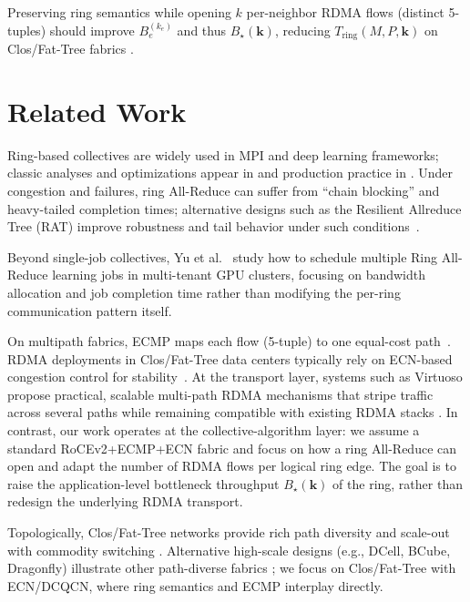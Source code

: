 \documentclass[12pt]{article}
\begin{document}
Preserving ring semantics while opening $k$ per-neighbor RDMA flows (distinct 5-tuples) should improve $B_e^{(k_e)}$ and thus $B_\star(\mathbf{k})$, reducing $T_{\text{ring}}(M,P,\mathbf{k})$ on Clos/Fat-Tree fabrics \cite{zhu2015dcqcn}.





\section{Related Work}
Ring-based collectives are widely used in MPI and deep learning frameworks; classic analyses and optimizations appear in \cite{thakur2005collectives} and production practice in \cite{sergeev2018horovod,nv-nccl-env}. Under congestion and failures, ring All-Reduce can suffer from “chain blocking” and heavy-tailed completion times; alternative designs such as the Resilient Allreduce Tree (RAT) improve robustness and tail behavior under such conditions~\cite{wan2020rat}.

Beyond single-job collectives, Yu et al.~\cite{yu2022scheduling} study how to schedule multiple Ring All-Reduce learning jobs in multi-tenant GPU clusters, focusing on bandwidth allocation and job completion time rather than modifying the per-ring communication pattern itself.

On multipath fabrics, ECMP maps each flow (5-tuple) to one equal-cost path~\cite{hopps2000rfc2992}. RDMA deployments in Clos/Fat-Tree data centers typically rely on ECN-based congestion control for stability~\cite{zhu2015dcqcn}. At the transport layer, systems such as Virtuoso propose practical, scalable multi-path RDMA mechanisms that stripe traffic across several paths while remaining compatible with existing RDMA stacks \cite{luo2020virtuoso}. In contrast, our work operates at the collective-algorithm layer: we assume a standard RoCEv2+ECMP+ECN fabric and focus on how a ring All-Reduce can open and adapt the number of RDMA flows per logical ring edge. The goal is to raise the application-level bottleneck throughput $B_\star(\mathbf{k})$ of the ring, rather than redesign the underlying RDMA transport.


Topologically, Clos/Fat-Tree networks provide rich path diversity and scale-out with commodity switching \cite{leiserson1985fattree,alfares2008scalable}. Alternative high-scale designs (e.g., DCell, BCube, Dragonfly) illustrate other path-diverse fabrics \cite{guo2008dcell,guo2009bcube,kim2008dragonfly}; we focus on Clos/Fat-Tree with ECN/DCQCN, where ring semantics and ECMP interplay directly.
\end{document}
